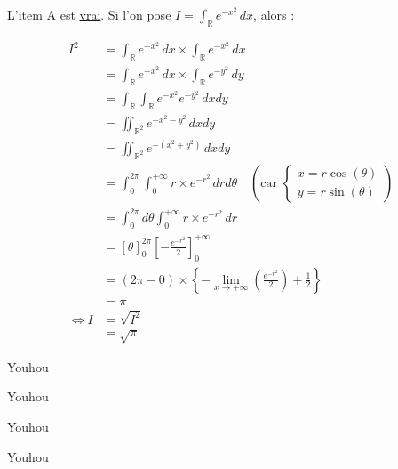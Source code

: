 \documentclass[12pt]{article}
\begin{document}
\begin{correction}
    L'item A est \uline{vrai}. Si l'on pose $I=\int_{\mathbb R} e^{-x^2}\, dx$, alors :

    $$
    \begin{aligned}
        I^2 
            &= \int_{\mathbb R} e^{-x^2}\, dx \times \int_{\mathbb R} e^{-x^2}\, dx\\
            &= \int_{\mathbb R} e^{-x^2}\, dx \times \int_{\mathbb R} e^{-y^2}\, dy\\
            &= \int_{\mathbb R}\int_{\mathbb R} e^{-x^2}e^{-y^2}\, dxdy\\
            &= \iint_{\mathbb R^2} e^{-x^2-y^2}\, dxdy\\
            &= \iint_{\mathbb R^2} e^{-\left(x^2+y^2\right)}\, dxdy\\
            &= \int_{0}^{2\pi}\int_{0}^{+\infty} r\times e^{-r^2}\, dr d\theta
                \quad
                    \left(\text{car 
                        $\begin{cases}
                            x=r\cos(\theta)\\
                            y=r\sin(\theta)
                        \end{cases}$}
                    \right)\\
            &= \int_{0}^{2\pi}d\theta\int_{0}^{+\infty} r\times e^{-r^2}\, dr\\
            &= [\theta]_{0}^{2\pi}\left[-\frac{e^{-r^2}}{2}\right]_{0}^{+\infty}\\
            &= \left(2\pi - 0\right) \times \left\{-\lim_{x\to +\infty} \left(\frac{e^{-r^2}}{2}\right) + \frac{1}{2}\right\}\\
            &= \pi\\
        \iff I &= \sqrt{I^2}\\
        &= \sqrt{\pi}
    \end{aligned}
    $$

    Youhou
    
    Youhou
    
    Youhou
    
    Youhou
\end{correction}
\end{document}
